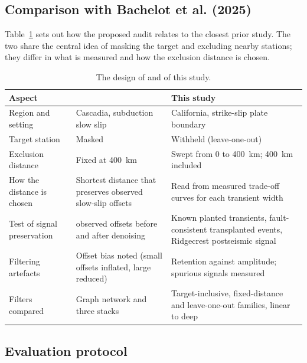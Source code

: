 \documentclass[11pt,a4paper]{article}
\begin{document}
\subsection{Comparison with Bachelot et al. (2025)}

Table~\ref{tab:bachelot} sets out how the proposed audit relates to the closest prior study. The two share the central idea of masking the target and excluding nearby stations; they differ in what is measured and how the exclusion distance is chosen.

\begin{table}[ht]
\centering
\caption{The design of \citet{bachelot2025} and of this study.}
\label{tab:bachelot}
\small
\begin{tabular}{>{\raggedright\arraybackslash}p{3.2cm} >{\raggedright\arraybackslash}p{5.4cm} >{\raggedright\arraybackslash}p{5.4cm}}
\toprule
Aspect & \citet{bachelot2025} & This study \\
\midrule
Region and setting & Cascadia, subduction slow slip & California, strike-slip plate boundary \\
Target station & Masked & Withheld (leave-one-out) \\
Exclusion distance & Fixed at 400~km & Swept from 0 to 400~km; 400~km included \\
How the distance is chosen & Shortest distance that preserves observed slow-slip offsets & Read from measured trade-off curves for each transient width \\
Test of signal preservation & 280 observed offsets before and after denoising & Known planted transients, fault-consistent transplanted events, Ridgecrest postseismic signal \\
Filtering artefacts & Offset bias noted (small offsets inflated, large reduced) & Retention against amplitude; spurious signals measured \\
Filters compared & Graph network and three stacks & Target-inclusive, fixed-distance and leave-one-out families, linear to deep \\
\bottomrule
\end{tabular}
\end{table}

\subsection{Evaluation protocol}
\label{sec:protocol}
\end{document}
